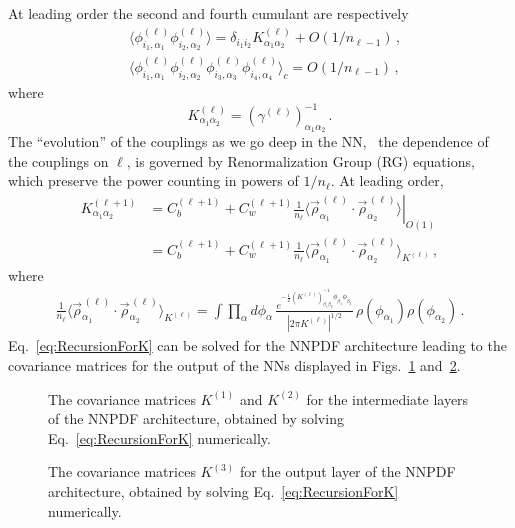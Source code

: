 \documentclass[11pt]{article}
\begin{document}
At leading order the second and fourth cumulant are respectively
\begin{align}
    &\langle \phi^{(\ell)}_{i_1,\alpha_1} \phi^{(\ell)}_{i_2,\alpha_2}\rangle
      = \delta_{i_1 i_2} K^{(\ell)}_{\alpha_1\alpha_2} + O(1/n_{\ell-1})\, , \\
    &\langle \phi^{(\ell)}_{i_1,\alpha_1} \phi^{(\ell)}_{i_2,\alpha_2} 
      \phi^{(\ell)}_{i_3,\alpha_3} \phi^{(\ell)}_{i_4,\alpha_4}\rangle_c 
      = O(1/n_{\ell-1})\, ,
\end{align}
where 
\begin{equation}
    \label{eq:DefineKmat}
    K^{(\ell)}_{\alpha_1\alpha_2} = \left(\gamma^{(\ell)}\right)^{-1}_{\alpha_1\alpha_2}\, .
\end{equation}
The ``evolution'' of the couplings as we go deep in the NN, \ie\ the dependence of the couplings on 
$\ell$, is governed by Renormalization Group (RG) equations, which preserve the power counting in 
powers of $1/n_{\ell}$. At leading order, 
\begin{align}
    K^{(\ell+1)}_{\alpha_1\alpha_2} &= 
      \left. 
      C_b^{(\ell+1)} + C_w^{(\ell+1)} \frac{1}{n_\ell} 
      \langle \vec{\rho}^{\,(\ell)}_{\alpha_1} \cdot
      \vec{\rho}^{\,(\ell)}_{\alpha_2} \rangle 
      \right|_{O(1)} \\
      \label{eq:RecursionForK}
      &= C_b^{(\ell+1)} + C_w^{(\ell+1)} \frac{1}{n_\ell} 
      \langle \vec{\rho}^{\,(\ell)}_{\alpha_1} \cdot
      \vec{\rho}^{\,(\ell)}_{\alpha_2} \rangle_{K^{(\ell)}}\, ,
\end{align}
where
\begin{align*}
    \frac{1}{n_\ell} 
      \langle \vec{\rho}^{\,(\ell)}_{\alpha_1} \cdot
      \vec{\rho}^{\,(\ell)}_{\alpha_2} \rangle_{K^{(\ell)}} = 
    \int \prod_{\alpha}d\phi_\alpha\, 
      \frac{e^{-\frac12 \left(K^{(\ell)}\right)^{-1}_{\beta_1\beta_2}
        \phi_{\beta_1} \phi_{\beta_2}}}
        {\left|2\pi K^{(\ell)}\right|^{1/2}}\,
        \rho(\phi_{\alpha_1}) \rho(\phi_{\alpha_2})\, .
\end{align*}
Eq.~\eqref{eq:RecursionForK} can be solved for the NNPDF architecture leading to the 
covariance matrices for the output of the NNs displayed in 
Figs.~\ref{Fig:KRecursionOne} and~\ref{Fig:KRecursionTwo}.
\begin{figure}[ht]
    \caption{The covariance matrices $K^{(1)}$ and $K^{(2)}$ for the intermediate layers 
    of the NNPDF architecture, obtained by solving Eq.~\eqref{eq:RecursionForK} numerically.
    \label{Fig:KRecursionOne}
    }
\end{figure}
\begin{figure}[ht]
    \caption{The covariance matrices $K^{(3)}$ for the output layer 
    of the NNPDF architecture, obtained by solving Eq.~\eqref{eq:RecursionForK} numerically.
    \label{Fig:KRecursionTwo}
    }
\end{figure}
\end{document}
